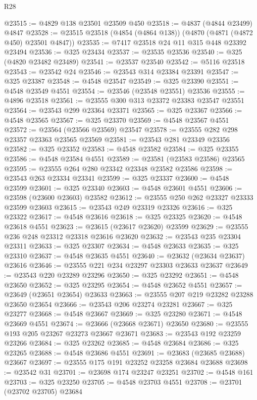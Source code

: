 \begin{lexlean}{R28}
\begin{coremodule}
@23515 := @4829 @138 @23501 @23509 @450
@23518 := @4837 (@4844 @23499) @4847
@23528 := @23515 @23518 (@4854 (@4864 @138)) (@4870 (@4871 (@4872 @450) @23501 @4847))
@23535 := @7417 @23518 @24 @11 @315 @448 @23392 @23494
@23536 := @325 @23434
@23537 := @23535 @23536
@23540 := @325 (@4820 @23482 @23489)
@23541 := @23537 @23540
@23542 := @5116 @23518
@23543 := @23542 @24
@23546 := @23543 @314 @23384 @23391
@23547 := @325 @23387
@23548 := @4548 @23547
@23549 := @325 @23390
@23551 := @4548 @23549 @4551
@23554 := @23546 (@23548 @23551) @23536
@23555 := @4896 @23518
@23561 := @23555 @300 @313 @23372 @23383 @23547 @23551
@23564 := @23543 @299 @23364 @23371
@23565 := @325 @23367
@23566 := @4548 @23565
@23567 := @325 @23370
@23569 := @4548 @23567 @4551
@23572 := @23564 (@23566 @23569) @23547
@23578 := @23555 @282 @298 @23357 @23363 @23565 @23569
@23581 := @23543 @281 @23349 @23356
@23582 := @325 @23352
@23583 := @4548 @23582
@23584 := @325 @23355
@23586 := @4548 @23584 @4551
@23589 := @23581 (@23583 @23586) @23565
@23595 := @23555 @264 @280 @23342 @23348 @23582 @23586
@23598 := @23543 @263 @23334 @23341
@23599 := @325 @23337
@23600 := @4548 @23599
@23601 := @325 @23340
@23603 := @4548 @23601 @4551
@23606 := @23598 (@23600 @23603) @23582
@23612 := @23555 @250 @262 @23327 @23333 @23599 @23603
@23615 := @23543 @249 @23319 @23326
@23616 := @325 @23322
@23617 := @4548 @23616
@23618 := @325 @23325
@23620 := @4548 @23618 @4551
@23623 := @23615 (@23617 @23620) @23599
@23629 := @23555 @236 @248 @23312 @23318 @23616 @23620
@23632 := @23543 @235 @23304 @23311
@23633 := @325 @23307
@23634 := @4548 @23633
@23635 := @325 @23310
@23637 := @4548 @23635 @4551
@23640 := @23632 (@23634 @23637) @23616
@23646 := @23555 @221 @234 @23297 @23303 @23633 @23637
@23649 := @23543 @220 @23289 @23296
@23650 := @325 @23292
@23651 := @4548 @23650
@23652 := @325 @23295
@23654 := @4548 @23652 @4551
@23657 := @23649 (@23651 @23654) @23633
@23663 := @23555 @207 @219 @23282 @23288 @23650 @23654
@23666 := @23543 @206 @23274 @23281
@23667 := @325 @23277
@23668 := @4548 @23667
@23669 := @325 @23280
@23671 := @4548 @23669 @4551
@23674 := @23666 (@23668 @23671) @23650
@23680 := @23555 @193 @205 @23267 @23273 @23667 @23671
@23683 := @23543 @192 @23259 @23266
@23684 := @325 @23262
@23685 := @4548 @23684
@23686 := @325 @23265
@23688 := @4548 @23686 @4551
@23691 := @23683 (@23685 @23688) @23667
@23697 := @23555 @175 @191 @23252 @23258 @23684 @23688
@23698 := @23542 @31
@23701 := @23698 @174 @23247 @23251
@23702 := @4548 @161
@23703 := @325 @23250
@23705 := @4548 @23703 @4551
@23708 := @23701 (@23702 @23705) @23684

\end{coremodule}
\end{lexlean}
